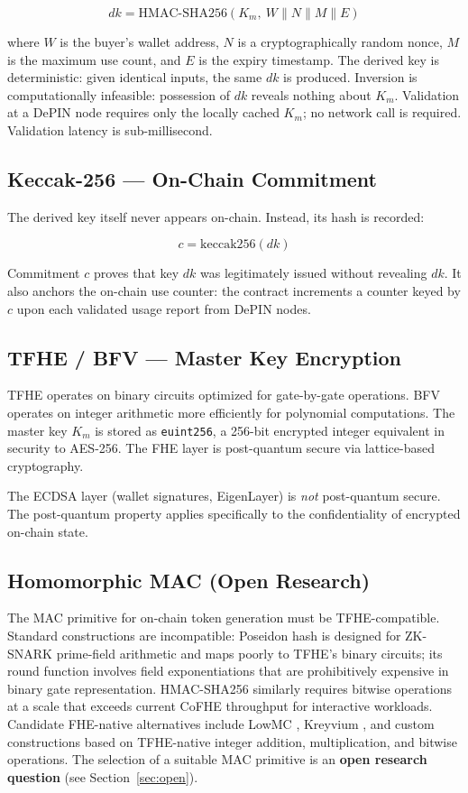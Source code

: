 \documentclass[conference]{IEEEtran}
\begin{document}
\begin{equation}
dk = \mathrm{HMAC\text{-}SHA256}(K_m,\ W \| N \| M \| E)
\label{eq:hmac}
\end{equation}

where $W$ is the buyer's wallet address, $N$ is a cryptographically random nonce,
$M$ is the maximum use count, and $E$ is the expiry timestamp. The derived key is
deterministic: given identical inputs, the same $dk$ is produced. Inversion is
computationally infeasible: possession of $dk$ reveals nothing about $K_m$. Validation
at a DePIN node requires only the locally cached $K_m$; no network call is required.
Validation latency is sub-millisecond.

\subsection{Keccak-256 --- On-Chain Commitment}
The derived key itself never appears on-chain. Instead, its hash is recorded:

\begin{equation}
c = \mathrm{keccak256}(dk)
\label{eq:commitment}
\end{equation}

Commitment $c$ proves that key $dk$ was legitimately issued without revealing $dk$.
It also anchors the on-chain use counter: the contract increments a counter keyed by
$c$ upon each validated usage report from DePIN nodes.

\subsection{TFHE / BFV --- Master Key Encryption}
TFHE \cite{zama_tfhe} operates on binary circuits optimized for gate-by-gate operations.
BFV \cite{bfv} operates on integer arithmetic more efficiently for polynomial computations.
The master key $K_m$ is stored as \texttt{euint256}, a 256-bit encrypted integer equivalent
in security to AES-256. The FHE layer is post-quantum secure via lattice-based cryptography.

The ECDSA layer (wallet signatures, EigenLayer) is \emph{not} post-quantum secure. The
post-quantum property applies specifically to the confidentiality of encrypted on-chain state.

\subsection{Homomorphic MAC (Open Research)}
The MAC primitive for on-chain token generation must be TFHE-compatible. Standard
constructions are incompatible: Poseidon hash is designed for ZK-SNARK prime-field
arithmetic and maps poorly to TFHE's binary circuits; its round function involves
field exponentiations that are prohibitively expensive in binary gate representation.
HMAC-SHA256 similarly requires bitwise operations at a scale that exceeds current
CoFHE throughput for interactive workloads. Candidate FHE-native alternatives include
LowMC \cite{lowmc}, Kreyvium \cite{kreyvium}, and custom constructions based on
TFHE-native integer addition, multiplication, and bitwise operations. The selection
of a suitable MAC primitive is an \textbf{open research question} (see Section~\ref{sec:open}).
\end{document}
